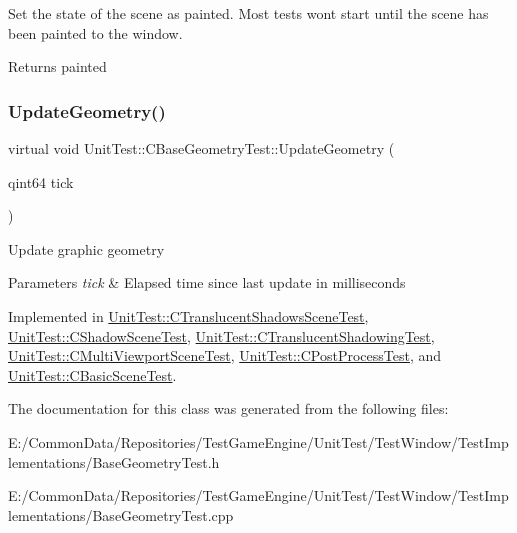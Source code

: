 Set the state of the scene as painted. Most tests won\textquotesingle{}t start until the scene has been painted to the window. \begin{DoxyReturn}{Returns}
painted 
\end{DoxyReturn}
\mbox{\label{class_unit_test_1_1_c_base_geometry_test_afe9560d667ef457f7a203453c10593fd}} 
\subsubsection{\texorpdfstring{UpdateGeometry()}{UpdateGeometry()}}
{\footnotesize\ttfamily virtual void Unit\+Test\+::\+C\+Base\+Geometry\+Test\+::\+Update\+Geometry (\begin{DoxyParamCaption}\item[{qint64}]{tick }\end{DoxyParamCaption})\hspace{0.3cm}{\ttfamily [pure virtual]}}

Update graphic geometry 
\begin{DoxyParams}{Parameters}
{\em tick} & Elapsed time since last update in milliseconds \\
\hline
\end{DoxyParams}


Implemented in \mbox{\hyperlink{class_unit_test_1_1_c_translucent_shadows_scene_test_a914c4b6892c7a28a66fbbaf9e96ba73a}{Unit\+Test\+::\+C\+Translucent\+Shadows\+Scene\+Test}}, \mbox{\hyperlink{class_unit_test_1_1_c_shadow_scene_test_a5586404efaf70bc59cefd4616fe7f761}{Unit\+Test\+::\+C\+Shadow\+Scene\+Test}}, \mbox{\hyperlink{class_unit_test_1_1_c_translucent_shadowing_test_a6d0809018d48d6f3f9e80147b894da5d}{Unit\+Test\+::\+C\+Translucent\+Shadowing\+Test}}, \mbox{\hyperlink{class_unit_test_1_1_c_multi_viewport_scene_test_a1a321eb10c463501feb70cb61b1add01}{Unit\+Test\+::\+C\+Multi\+Viewport\+Scene\+Test}}, \mbox{\hyperlink{class_unit_test_1_1_c_post_process_test_aa1da5079813a860b1cc8a3554bce6f04}{Unit\+Test\+::\+C\+Post\+Process\+Test}}, and \mbox{\hyperlink{class_unit_test_1_1_c_basic_scene_test_a670726a40875ee0981cca18a3ea7ad0b}{Unit\+Test\+::\+C\+Basic\+Scene\+Test}}.



The documentation for this class was generated from the following files\+:\begin{DoxyCompactItemize}
\item 
E\+:/\+Common\+Data/\+Repositories/\+Test\+Game\+Engine/\+Unit\+Test/\+Test\+Window/\+Test\+Implementations/Base\+Geometry\+Test.\+h\item 
E\+:/\+Common\+Data/\+Repositories/\+Test\+Game\+Engine/\+Unit\+Test/\+Test\+Window/\+Test\+Implementations/Base\+Geometry\+Test.\+cpp\end{DoxyCompactItemize}
